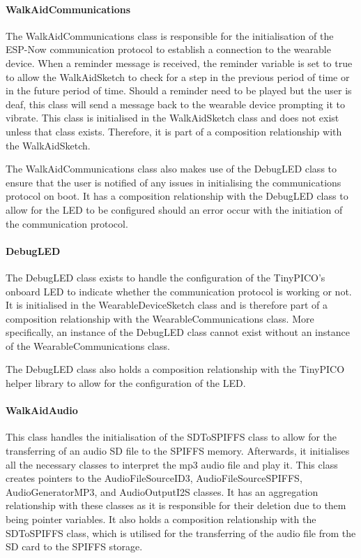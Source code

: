                 \paragraph{WalkAidCommunications}\mbox{}

                    The WalkAidCommunications class is responsible for the initialisation of the ESP-Now communication protocol to establish a connection to the wearable device. When a reminder message is received, the reminder variable is set to true to allow the WalkAidSketch to check for a step in the previous period of time or in the future period of time. Should a reminder need to be played but the user is deaf, this class will send a message back to the wearable device prompting it to vibrate. This class is initialised in the WalkAidSketch class and does not exist unless that class exists. Therefore, it is part of a composition relationship with the WalkAidSketch.

                    The WalkAidCommunications class also makes use of the DebugLED class to ensure that the user is notified of any issues in initialising the communications protocol on boot. It has a composition relationship with the DebugLED class to allow for the LED to be configured should an error occur with the initiation of the communication protocol.

                \paragraph{DebugLED}\mbox{}

                    The DebugLED class exists to handle the configuration of the TinyPICO's onboard LED to indicate whether the communication protocol is working or not. It is initialised in the WearableDeviceSketch class and is therefore part of a composition relationship with the WearableCommunications class. More specifically, an instance of the DebugLED class cannot exist without an instance of the WearableCommunications class.

                    The DebugLED class also holds a composition relationship with the TinyPICO helper library to allow for the configuration of the LED.

                \paragraph{WalkAidAudio}\mbox{}

                    This class handles the initialisation of the SDToSPIFFS class to allow for the transferring of an audio SD file to the SPIFFS memory. Afterwards, it initialises all the necessary classes to interpret the mp3 audio file and play it. This class creates pointers to the AudioFileSourceID3, AudioFileSourceSPIFFS, AudioGeneratorMP3, and AudioOutputI2S classes. It has an aggregation relationship with these classes as it is responsible for their deletion due to them being pointer variables. It also holds a composition relationship with the SDToSPIFFS class, which is utilised for the transferring of the audio file from the SD card to the SPIFFS storage. 

